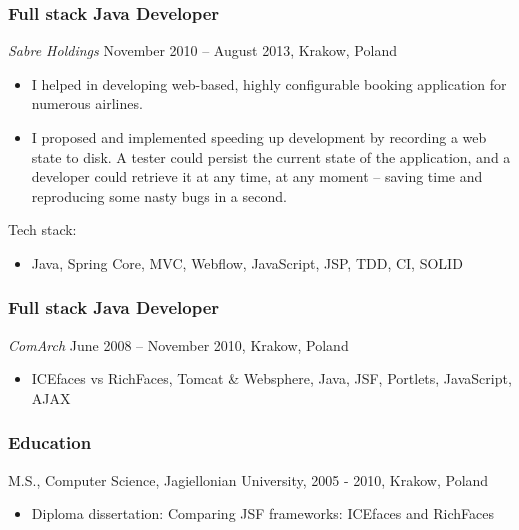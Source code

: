 \documentclass[]{rss}
\providecommand{\tightlist}{%
  \setlength{\itemsep}{0pt}\setlength{\parskip}{0pt}}
\begin{document}
\begin{resume}
\subsubsection{Full stack Java
Developer}\label{full-stack-java-developer}

\emph{Sabre Holdings} November 2010 -- August 2013, Krakow, Poland

\begin{itemize}
\item
  I helped in developing web-based, highly configurable booking
  application for numerous airlines.
\item
  I proposed and implemented speeding up development by recording a web
  state to disk. A tester could persist the current state of the
  application, and a developer could retrieve it at any time, at any
  moment -- saving time and reproducing some nasty bugs in a second.
\end{itemize}

Tech stack:

\begin{itemize}
\tightlist
\item
  Java, Spring Core, MVC, Webflow, JavaScript, JSP, TDD, CI, SOLID
\end{itemize}

\subsubsection{Full stack Java
Developer}\label{full-stack-java-developer-1}

\emph{ComArch} June 2008 -- November 2010, Krakow, Poland

\begin{itemize}
\tightlist
\item
  ICEfaces vs RichFaces, Tomcat \& Websphere, Java, JSF, Portlets,
  JavaScript, AJAX
\end{itemize}

\subsubsection{Education}\label{education}

M.S., Computer Science, Jagiellonian University, 2005 - 2010, Krakow,
Poland

\begin{itemize}
\tightlist
\item
  Diploma dissertation: Comparing JSF frameworks: ICEfaces and RichFaces
\end{itemize}

\end{resume}
\end{document}
